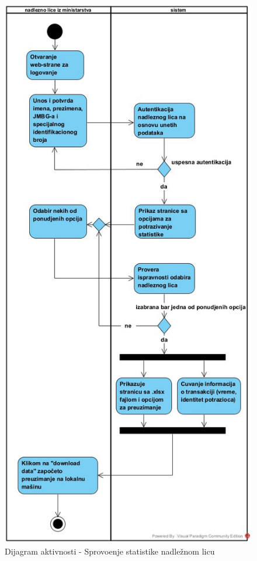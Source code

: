 \documentclass[titlepage]{article}
\begin{document}
\begin{itemize}

\end{itemize}

\begin{figure}[H]
\includegraphics[scale=0.45]{Sprovodjenje_statistike}
\caption{Dijagram aktivnosti - Sprovo\dj{}enje statistike nadle\v{z}nom licu}
\end{figure}
\end{document}
